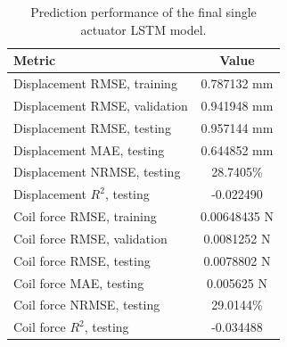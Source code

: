 \begin{table}[H]
\centering
\caption{Prediction performance of the final single actuator LSTM model.}
\label{tab:lstm_prediction_metrics_final}
\begin{tabular}{l c}
\toprule
Metric & Value \\ 
\midrule
Displacement RMSE, training & 0.787132 mm \\ 
Displacement RMSE, validation & 0.941948 mm \\ 
Displacement RMSE, testing & 0.957144 mm \\ 
Displacement MAE, testing & 0.644852 mm \\ 
Displacement NRMSE, testing & 28.7405\% \\ 
Displacement $R^2$, testing & -0.022490 \\ 
Coil force RMSE, training & 0.00648435 N \\ 
Coil force RMSE, validation & 0.0081252 N \\ 
Coil force RMSE, testing & 0.0078802 N \\ 
Coil force MAE, testing & 0.005625 N \\ 
Coil force NRMSE, testing & 29.0144\% \\ 
Coil force $R^2$, testing & -0.034488 \\ 
\bottomrule
\end{tabular}
\end{table}
